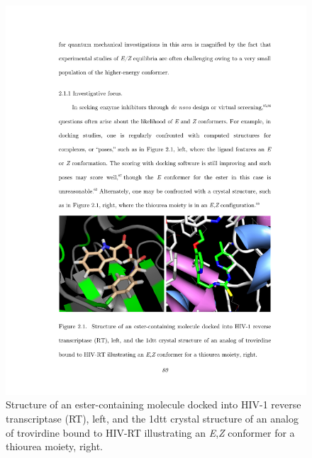 \documentclass[12pt]{report}
\begin{document}
\begin{figure}[b!]
\centering
\includegraphics[scale=0.999]{figures/pdf/ezfig.pdf}
\caption{Structure of an ester-containing molecule docked into HIV-1 reverse transcriptase (RT), left, and the 1dtt crystal structure of an analog of trovirdine bound to HIV-RT illustrating an \textit{E},\textit{Z} conformer for a thiourea moiety, right.}
\label{ezfig}
\end{figure}
\end{document}
